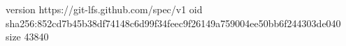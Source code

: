 version https://git-lfs.github.com/spec/v1
oid sha256:852cd7b45b38df74148c6d99f34feec9f26149a759004ee50bb6f244303de040
size 43840
